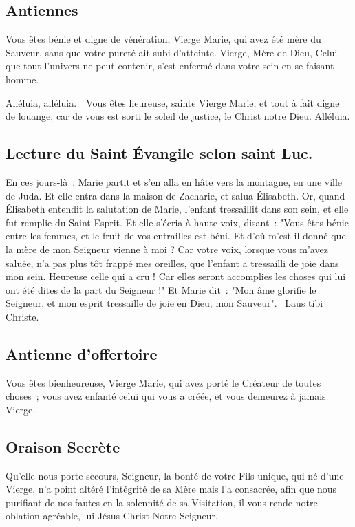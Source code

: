 \begin{multicols}{2}
\subsection*{Antiennes}
Vous êtes bénie et digne de vénération, Vierge Marie, qui avez été mère du Sauveur, sans que votre pureté ait subi d’atteinte. Vierge, Mère de Dieu, Celui que tout l’univers ne peut contenir, s’est enfermé dans votre sein en se faisant homme.

Alléluia, alléluia. \vb\ Vous êtes heureuse, sainte Vierge Marie, et tout à fait digne de louange, car de vous est sorti le soleil de justice, le Christ notre Dieu. Alléluia.

\subsection*{Lecture du Saint Évangile selon saint Luc.}
En ces jours-là~: Marie partit et s’en alla en hâte vers la montagne, en une ville de Juda. Et elle entra dans la maison de Zacharie, et salua Élisabeth. Or, quand Élisabeth entendit la salutation de Marie, l’enfant tressaillit dans son sein, et elle fut remplie du Saint-Esprit. Et elle s’écria à haute voix, disant~: "Vous êtes bénie entre les femmes, et le fruit de vos entrailles est béni. Et d’où m’est-il donné que la mère de mon Seigneur vienne à moi ? Car votre voix, lorsque vous m’avez saluée, n’a pas plus tôt frappé mes oreilles, que l’enfant a tressailli de joie dans mon sein. Heureuse celle qui a cru ! Car elles seront accomplies les choses qui lui ont été dites de la part du Seigneur !" Et Marie dit~: "Mon âme glorifie le Seigneur, et mon esprit tressaille de joie en Dieu, mon Sauveur".
{\textbf \rb\ Laus tibi Christe.}

\subsection*{Antienne d'offertoire}
Vous êtes bienheureuse, Vierge Marie, qui avez porté le Créateur de toutes choses ; vous avez enfanté celui qui vous a créée, et vous demeurez à jamais Vierge.

\subsection*{Oraison Secrète}
Qu’elle nous porte secours, Seigneur, la bonté de votre Fils unique, qui né d’une Vierge, n’a point altéré l’intégrité de sa Mère mais l’a consacrée, afin que nous purifiant de nos fautes en la solennité de sa Visitation, il vous rende notre oblation agréable, lui Jésus-Christ Notre-Seigneur.


\end{multicols}

